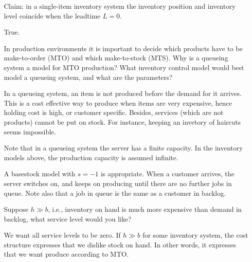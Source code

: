 \documentclass[stochastic-or.tex]{subfiles}
\begin{document}
\begin{truefalse}
Claim: in a single-item inventory system the inventory position and inventory level coincide when the leadtime $L=0$.
\begin{solution}
        True.
\end{solution}
\end{truefalse}

\begin{exercise}
In production environments it is important to decide which products have to be make-to-order (MTO) and which make-to-stock (MTS). Why is a queueing system a model for MTO production? What inventory control model would best model a queueing system, and what are the parameters?
\begin{solution}
In a queueing system, an item is not produced before the demand for it arrives. This is a cost effective way to produce when items are very expensive, hence holding cost is high, or customer specific. Besides, services (which are not products) cannot be put on stock. For instance, keeping an invetory of haircuts seems impossible.

Note that in a queueing system the server has a finite capacity. In the inventory models above, the production capacity is assumed infinite.

A basestock model with $s=-1$ is appropriate. When a customer arrives, the server switches on, and keeps on producing until there are no further jobs in queue. Note also that a job in queue is the same as a customer in backlog.
\end{solution}
\end{exercise}


\begin{exercise}
  Suppose $h\gg b$, i.e.,  inventory on hand is much more expensive than demand in backlog, what service level would you like?
  \begin{solution}
    We want all service levels to be zero. If $h\gg b$ for some inventory system, the cost structure expresses that we dislike stock on hand. In other words, it expresses that we want produce according to MTO.
  \end{solution}
\end{exercise}
\end{document}
